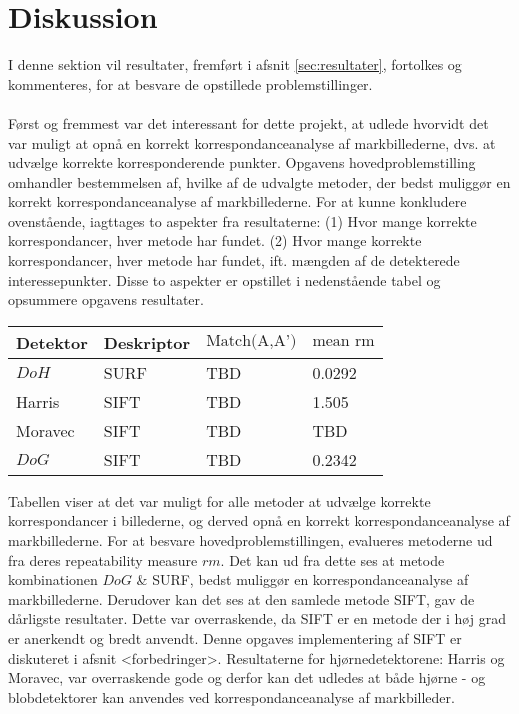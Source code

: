 \chapter{Diskussion}
I denne sektion vil resultater, fremført i afsnit \ref{sec:resultater}, fortolkes og kommenteres, for at besvare de opstillede problemstillinger. \\ \\
Først og fremmest var det interessant for dette projekt, at udlede hvorvidt det var muligt at opnå en korrekt korrespondanceanalyse af markbillederne, dvs. at udvælge korrekte korresponderende punkter. Opgavens hovedproblemstilling omhandler bestemmelsen af, hvilke af de udvalgte metoder, der bedst muliggør en korrekt korrespondanceanalyse af markbillederne. For at kunne konkludere ovenstående, iagttages to aspekter fra resultaterne: (1) Hvor mange korrekte korrespondancer, hver metode har fundet. (2) Hvor mange korrekte korrespondancer, hver metode har fundet, ift. mængden af de detekterede interessepunkter. Disse to aspekter er opstillet i nedenstående tabel og opsummere opgavens resultater.
\begin{center}
    \begin{tabular}{ | l | l | l | l |}
    \hline
    Detektor & Deskriptor & $\text{Match(A,A')}$ & $\text{mean rm}$ \\ \hline
    $DoH$ & SURF & TBD & 0.0292 \\ \hline  
    Harris & SIFT & TBD & 1.505 \\ \hline    
    Moravec & SIFT & TBD & TBD \\ \hline    
    $DoG$ & SIFT & TBD & 0.2342 \\ \hline         
    \end{tabular}
    \label{table:tab}
\end{center}
Tabellen viser at det var muligt for alle metoder at udvælge korrekte korrespondancer i billederne, og derved opnå en korrekt korrespondanceanalyse af markbillederne. For at besvare hovedproblemstillingen, evalueres metoderne ud fra deres repeatability measure $rm$. Det kan ud fra dette ses at metode kombinationen $DoG$ \& SURF, bedst muliggør en korrespondanceanalyse af markbillederne. Derudover kan det ses at den samlede metode SIFT, gav de dårligste resultater. Dette var overraskende, da SIFT er en metode der i høj grad er anerkendt og bredt anvendt. Denne opgaves implementering af SIFT er diskuteret i afsnit <forbedringer>. Resultaterne for hjørnedetektorene: Harris og Moravec, var overraskende gode og derfor kan det udledes at både hjørne - og blobdetektorer kan anvendes ved korrespondanceanalyse af markbilleder.

